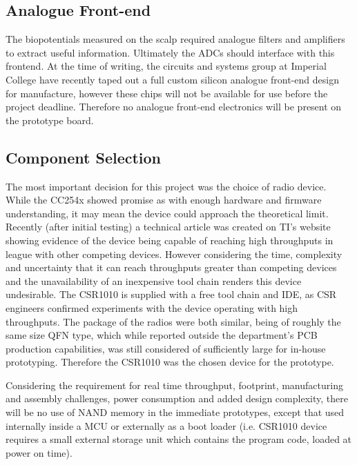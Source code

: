\documentclass[]{article}
\begin{document}
\subsection{Analogue Front-end}

The biopotentials measured on the scalp required analogue filters and amplifiers to extract useful information. Ultimately the \ac{ADC}s should interface with this frontend.  At the time of writing, the circuits and systems group at Imperial College have recently taped out a full custom silicon analogue front-end design for manufacture, however these chips will not be available for use before the project deadline. Therefore no analogue front-end electronics will be present on the prototype board.

\subsection{Component Selection}

The most important decision for this project was the choice of radio device. While the CC254x showed promise as with enough hardware and firmware understanding, it may mean the device could approach the theoretical limit. Recently (after initial testing) a technical article was created on \ac{TI}'s website \cite{overlapproc} showing evidence of the device being capable of reaching high throughputs in league with other competing devices. However considering the time, complexity and uncertainty that it can reach throughputs greater than competing devices and the unavailability of an inexpensive tool chain renders this device undesirable. The CSR1010 is supplied with a free tool chain and \ac{IDE}, as \ac{CSR} engineers confirmed experiments with the device operating with high throughputs. The package of the radios were both similar, being of roughly the same size \ac{QFN} type, which while reported outside the department's \ac{PCB} production capabilities, was still considered of sufficiently large for in-house prototyping. Therefore the CSR1010 was the chosen device for the prototype.

Considering the requirement for real time throughput, footprint, manufacturing and assembly challenges, power consumption and added design complexity, there will be no use of NAND memory in the immediate prototypes, except that used internally inside a \ac{MCU} or externally as a boot loader (i.e. CSR1010 device requires a small external storage unit which contains the program code, loaded at power on time).
\end{document}
